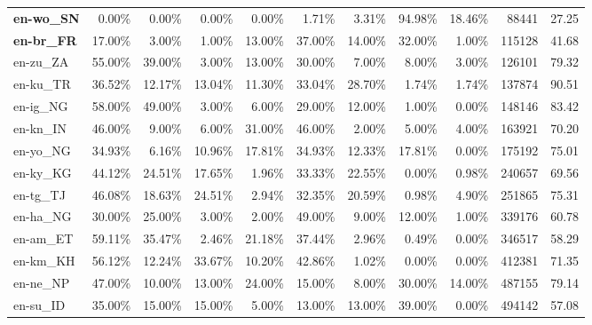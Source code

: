 \begin{table*}[hbt!]
{\begin{tabular}{l|rrrr|rrrr|rr}
            \textbf{en-wo\_SN}      & 0.00\%  & 0.00\%  & 0.00\%  & 0.00\%  & 1.71\%  & 3.31\%  & 94.98\% & 18.46\% & 88441       & 27.25             \\
            \textbf{en-br\_FR}      & 17.00\% & 3.00\%  & 1.00\%  & 13.00\% & 37.00\% & 14.00\% & 32.00\% & 1.00\%  & 115128      & 41.68             \\
            en-zu\_ZA               & 55.00\% & 39.00\% & 3.00\%  & 13.00\% & 30.00\% & 7.00\%  & 8.00\%  & 3.00\%  & 126101      & 79.32             \\
            en-ku\_TR               & 36.52\% & 12.17\% & 13.04\% & 11.30\% & 33.04\% & 28.70\% & 1.74\%  & 1.74\%  & 137874      & 90.51             \\
            en-ig\_NG               & 58.00\% & 49.00\% & 3.00\%  & 6.00\%  & 29.00\% & 12.00\% & 1.00\%  & 0.00\%  & 148146      & 83.42             \\
            en-kn\_IN               & 46.00\% & 9.00\%  & 6.00\%  & 31.00\% & 46.00\% & 2.00\%  & 5.00\%  & 4.00\%  & 163921      & 70.20             \\
            en-yo\_NG               & 34.93\% & 6.16\%  & 10.96\% & 17.81\% & 34.93\% & 12.33\% & 17.81\% & 0.00\%  & 175192      & 75.01             \\
            en-ky\_KG               & 44.12\% & 24.51\% & 17.65\% & 1.96\%  & 33.33\% & 22.55\% & 0.00\%  & 0.98\%  & 240657      & 69.56             \\
            en-tg\_TJ               & 46.08\% & 18.63\% & 24.51\% & 2.94\%  & 32.35\% & 20.59\% & 0.98\%  & 4.90\%  & 251865      & 75.31             \\
            en-ha\_NG               & 30.00\% & 25.00\% & 3.00\%  & 2.00\%  & 49.00\% & 9.00\%  & 12.00\% & 1.00\%  & 339176      & 60.78             \\
            en-am\_ET               & 59.11\% & 35.47\% & 2.46\%  & 21.18\% & 37.44\% & 2.96\%  & 0.49\%  & 0.00\%  & 346517      & 58.29             \\
            en-km\_KH               & 56.12\% & 12.24\% & 33.67\% & 10.20\% & 42.86\% & 1.02\%  & 0.00\%  & 0.00\%  & 412381      & 71.35             \\
            en-ne\_NP               & 47.00\% & 10.00\% & 13.00\% & 24.00\% & 15.00\% & 8.00\%  & 30.00\% & 14.00\% & 487155      & 79.14             \\
            en-su\_ID               & 35.00\% & 15.00\% & 15.00\% & 5.00\%  & 13.00\% & 13.00\% & 39.00\% & 0.00\%  & 494142      & 57.08             \\

\end{tabular}}
\end{table*}
